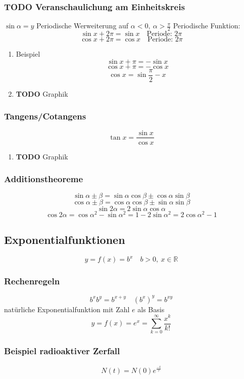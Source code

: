 \documentclass[11pt]{article}
\begin{document}
\subsubsection{{\bfseries\sffamily TODO} Veranschaulichung am Einheitskreis}
\label{sec-5-7-2}
$\sin{\alpha} = y$
Periodische Werweiterung auf $\alpha < 0,~\alpha>\frac{\pi}{2}$
Periodische Funktion: \[\sin{x + 2\pi} = \sin{x}\quad\text{Periode: }2\pi\]
\[\cos{x + 2\pi} = \cos{x}\quad\text{Periode: }2\pi\]
\begin{enumerate}
\item Beispiel
\label{sec-5-7-2-1}
\[\sin{x + \pi} = -\sin{x}\]
\[\cos{x + \pi} = -\cos{x}\]
\[\cos{x} = \sin{\frac{\pi}{2}-x}\]
\item {\bfseries\sffamily TODO} Graphik
\label{sec-5-7-2-2}
\end{enumerate}
\subsubsection{Tangens/Cotangens}
\label{sec-5-7-3}
\[\tan{x} = \frac{\sin{x}}{\cos{x}}\]
\begin{enumerate}
\item {\bfseries\sffamily TODO} Graphik
\label{sec-5-7-3-1}
\end{enumerate}
\subsubsection{Additionstheoreme}
\label{sec-5-7-4}
\[\sin{\alpha\pm\beta} = \sin{\alpha}\cos{\beta}\pm\cos{\alpha}\sin{\beta}\]
\[\cos{\alpha\pm\beta} = \cos{\alpha}\cos{\beta}\pm\sin{\alpha}\sin{\beta}\]
\[\sin{2\alpha} = 2\sin{\alpha}\cos{\alpha}\]
\[\cos{2\alpha} = \cos{\alpha}^2 - \sin{\alpha}^2=1 - 2\sin{\alpha}^2 = 2\cos{\alpha}^2 - 1\]
\subsection{Exponentialfunktionen}
\label{sec-5-8}
\[y=f(x)=b^x\quad b>0,~x\in\mathbb{R}\]
\subsubsection{Rechenregeln}
\label{sec-5-8-1}
\[b^x b^y = b^{x+y}\quad \left(b^x\right)^y = b^{xy}\]
natürliche Exponentialfunktion mit Zahl $e$ als Basis
\[y=f(x)=e^x=\sum_{k=0}^\infty \frac{x^k}{k!}\]
\subsubsection{Beispiel radioaktiver Zerfall}
\label{sec-5-8-2}
\[N(t) = N(0)e^\frac{-t}{\tau}\]
\end{document}
